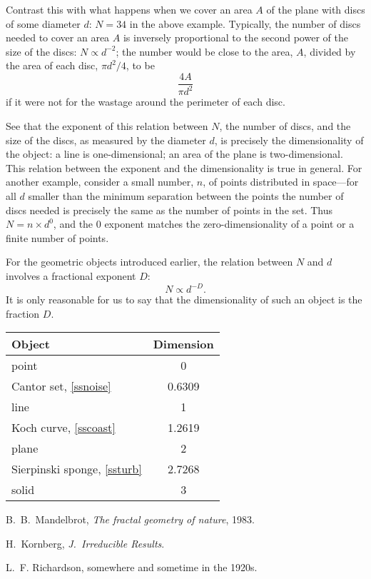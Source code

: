 Contrast this with what happens when we cover an area $A$ of the plane 
with discs of some diameter $d$: 
\(
	N=34
\)
 in the above example.  Typically, 
the number of discs needed to cover an area 
\(
	A
\)
is inversely proportional to the second power of the size of the 
discs: $N\propto d^{-2}$; the number would be close to the area, 
$A$, divided by the area of each disc, $\pi d^2/4$, to be  
\[
	\frac{4A}{\pi d^2}
\]
if it were not for the wastage around the perimeter of 
each disc.

See that the exponent of this relation between $N$, the number of 
discs, and the size of the discs, as measured by the diameter $d$, 
is precisely the dimensionality of the object: a line is 
one-dimensional; an area of the plane is two-dimensional.  This 
relation between the exponent and the dimensionality is true in 
general.  For another example, consider a small number, $n$, of 
points distributed in space---for all
\(
	d
\)
smaller than the minimum separation between the points the number of 
discs needed is precisely the same as the number of points in the set.  
Thus $N=n\times d^0$, and the 0 exponent matches the zero-dimensionality 
of a point or a finite number of points.

For the geometric objects introduced earlier, the relation between $
N$ and $d$ involves a fractional exponent $D$:
\begin{equation}
	N\propto d^{-D}.
	\label{eqf}
\end{equation}
It is only reasonable for us to say that the 
dimensionality of such an object is the fraction $D$.
\begin{center}
    \begin{tabular}{lc}
        \hline
        Object & Dimension  \\
        \hline
        point & 0  \\
        Cantor set, \cref{ssnoise} & 0.6309  \\
        line & 1  \\
        Koch curve, \cref{sscoast} & 1.2619  \\
        plane & 2  \\
        Sierpinski sponge, \cref{ssturb} & 2.7268  \\
        solid & 3  \\
        \hline
    \end{tabular}
\end{center}

\begin{thebibliography}{99}
	  B.~B.~Mandelbrot, \emph{The fractal geometry of 
	nature}, 1983.

	  H.~Kornberg, \emph{J.\ Irreducible Results}.

	  L.~F. Richardson, somewhere and sometime in the 1920s.
\end{thebibliography}


